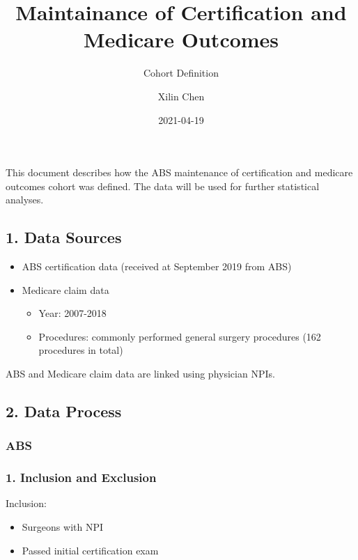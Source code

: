 \documentclass[
]{article}
\title{Maintainance of Certification and Medicare Outcomes}
\subtitle{Cohort Definition}
\author{Xilin Chen}
\date{2021-04-19}
\providecommand{\tightlist}{%
  \setlength{\itemsep}{0pt}\setlength{\parskip}{0pt}}
\begin{document}
\maketitle

{
\setcounter{tocdepth}{3}
\tableofcontents
}
This document describes how the ABS maintenance of certification and
medicare outcomes cohort was defined. The data will be used for further
statistical analyses.

\hypertarget{data-sources}{%
\subsection{1. Data Sources}\label{data-sources}}

\begin{itemize}
\tightlist
\item
  ABS certification data (received at September 2019 from ABS)
\item
  Medicare claim data

  \begin{itemize}
  \tightlist
  \item
    Year: 2007-2018
  \item
    Procedures: commonly performed general surgery procedures (162
    procedures in total)
  \end{itemize}
\end{itemize}

ABS and Medicare claim data are linked using physician NPIs.

\hypertarget{data-process}{%
\subsection{2. Data Process}\label{data-process}}

\hypertarget{abs}{%
\subsubsection{ABS}\label{abs}}

\hypertarget{inclusion-and-exclusion}{%
\subsubsection{1. Inclusion and
Exclusion}\label{inclusion-and-exclusion}}

Inclusion:

\begin{itemize}
\tightlist
\item
  Surgeons with NPI
\item
  Passed initial certification exam
\end{itemize}
\end{document}

